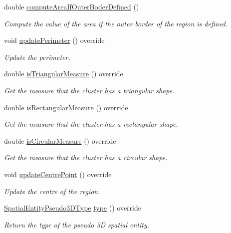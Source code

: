 \begin{DoxyCompactItemize}
double \hyperlink{classmultiscale_1_1analysis_1_1Region_ae40d20501ea54beee4350efd2fa8b06a}{compute\-Area\-If\-Outer\-Boder\-Defined} ()
\begin{DoxyCompactList}\small\item\em Compute the value of the area if the outer border of the region is defined. \end{DoxyCompactList}\item 
void \hyperlink{classmultiscale_1_1analysis_1_1Region_a58a4a22cb77fc6963592ec156458f310}{update\-Perimeter} () override
\begin{DoxyCompactList}\small\item\em Update the perimeter. \end{DoxyCompactList}\item 
double \hyperlink{classmultiscale_1_1analysis_1_1Region_acb88d149b42eee5225e7197a225d31c3}{is\-Triangular\-Measure} () override
\begin{DoxyCompactList}\small\item\em Get the measure that the cluster has a triangular shape. \end{DoxyCompactList}\item 
double \hyperlink{classmultiscale_1_1analysis_1_1Region_a2310c3e3c6f1dea310e14e46d466a204}{is\-Rectangular\-Measure} () override
\begin{DoxyCompactList}\small\item\em Get the measure that the cluster has a rectangular shape. \end{DoxyCompactList}\item 
double \hyperlink{classmultiscale_1_1analysis_1_1Region_aa59dcbe337f4db849d66cb3902617ccd}{is\-Circular\-Measure} () override
\begin{DoxyCompactList}\small\item\em Get the measure that the cluster has a circular shape. \end{DoxyCompactList}\item 
void \hyperlink{classmultiscale_1_1analysis_1_1Region_a3753b8789a73c1e3b5d189aa710aec86}{update\-Centre\-Point} () override
\begin{DoxyCompactList}\small\item\em Update the centre of the region. \end{DoxyCompactList}\item 
\hyperlink{namespacemultiscale_1_1analysis_a6db9cbf10615e77e300c3e4cb1c56660}{Spatial\-Entity\-Pseudo3\-D\-Type} \hyperlink{classmultiscale_1_1analysis_1_1Region_a7cac0117120ae96e40f5c7eec8266922}{type} () override
\begin{DoxyCompactList}\small\item\em Return the type of the pseudo 3\-D spatial entity. \end{DoxyCompactList}\end{DoxyCompactItemize}

